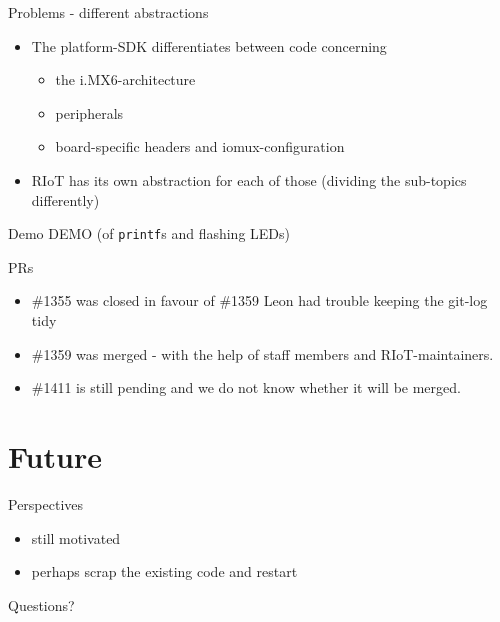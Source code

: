 \documentclass[9pt]{beamer}
\begin{document}
\begin{frame}{Problems - different abstractions}
 \begin{itemize}
\pause
 \item The platform-SDK differentiates between code concerning
\pause
 	\begin{itemize}
 	\item the i.MX6-architecture
\pause
 	\item peripherals
\pause
 	\item board-specific headers and iomux-configuration
\pause
 	\end{itemize}
 \item RIoT has its own abstraction for each of those (dividing the sub-topics differently)
 \end{itemize}
\end{frame}

\begin{frame}{Demo}
DEMO (of \texttt{printf}s and flashing LEDs)
\end{frame}

\begin{frame}{PRs}
 \begin{itemize}
 \item \#1355 was closed in favour of \#1359 \textcolor{light-gray}{Leon had trouble keeping the git-log tidy}
 \item \#1359 was merged - with the help of staff members and RIoT-maintainers.
 \item \#1411 is still pending and we do not know whether it will be merged.
 \end{itemize}
\end{frame}

\section{Future}

\begin{frame}{Perspectives}
 \begin{itemize}
 \item still motivated
 \item perhaps scrap the existing code and restart
 \end{itemize}
\end{frame}

\begin{frame}{Questions?}

\end{frame}
\end{document}
